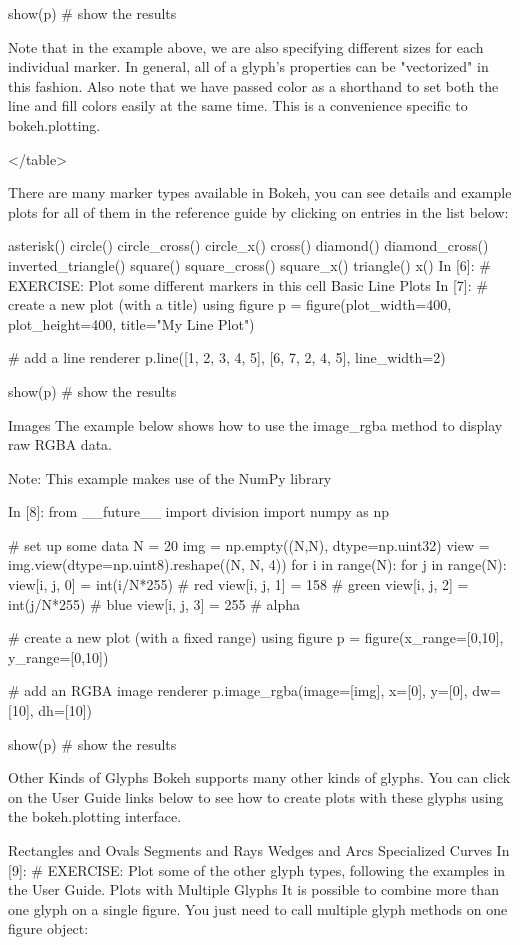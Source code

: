 show(p) # show the results
	
Note that in the example above, we are also specifying different sizes for each individual marker. In general, all of a glyph's properties can be "vectorized" in this fashion. Also note that we have passed color as a shorthand to set both the line and fill colors easily at the same time. This is a convenience specific to bokeh.plotting.

</table>

There are many marker types available in Bokeh, you can see details and example plots for all of them in the reference guide by clicking on entries in the list below:

asterisk()
circle()
circle_cross()
circle_x()
cross()
diamond()
diamond_cross()
inverted_triangle()
square()
square_cross()
square_x()
triangle()
x()
In [6]:
# EXERCISE: Plot some different markers in this cell
Basic Line Plots
In [7]:
# create a new plot (with a title) using figure
p = figure(plot_width=400, plot_height=400, title="My Line Plot")

# add a line renderer
p.line([1, 2, 3, 4, 5], [6, 7, 2, 4, 5], line_width=2)

show(p) # show the results
	
Images
The example below shows how to use the image_rgba method to display raw RGBA data.

Note: This example makes use of the NumPy library

In [8]:
from __future__ import division
import numpy as np

# set up some data
N = 20
img = np.empty((N,N), dtype=np.uint32)
view = img.view(dtype=np.uint8).reshape((N, N, 4))
for i in range(N):
    for j in range(N):
        view[i, j, 0] = int(i/N*255) # red
        view[i, j, 1] = 158          # green
        view[i, j, 2] = int(j/N*255) # blue
        view[i, j, 3] = 255          # alpha
        
# create a new plot (with a fixed range) using figure
p = figure(x_range=[0,10], y_range=[0,10])

# add an RGBA image renderer
p.image_rgba(image=[img], x=[0], y=[0], dw=[10], dh=[10])

show(p) # show the results
	
Other Kinds of Glyphs
Bokeh supports many other kinds of glyphs. You can click on the User Guide links below to see how to create plots with these glyphs using the bokeh.plotting interface.

Rectangles and Ovals
Segments and Rays
Wedges and Arcs
Specialized Curves
In [9]:
# EXERCISE: Plot some of the other glyph types, following the examples in the User Guide. 
Plots with Multiple Glyphs
It is possible to combine more than one glyph on a single figure. You just need to call multiple glyph methods on one figure object:

